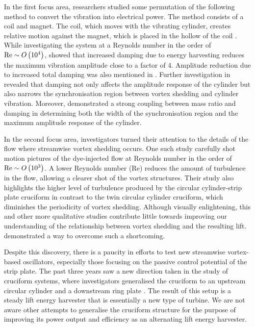 \documentclass[oneside]{utmthesis}
\begin{document}
In the first focus area, researchers studied some permutation of the following method to convert the vibration into electrical power. The method consists of a coil and magnet. The coil, which moves with the vibrating cylinder, creates relative motion against the magnet, which is placed in the hollow of the coil \citep{Koide2009}.
While investigating the system at a Reynolds number in the order of $\text{Re} \sim O \left( 10^{4} \right)$, \citet{Koide2009} showed that increased damping due to energy harvesting reduces the maximum vibration amplitude close to a factor of 4. Amplitude reduction due to increased total damping was also mentioned in \citet{Bernitsas2008a,Bernitsas2008b,Bernitsas2009}.
Further investigation in \citet{Nguyen2012} revealed that damping not only affects the amplitude response of the cylinder but also narrows the synchronisation region between vortex shedding and cylinder vibration. Moreover, \citet{Nguyen2012} demonstrated a strong coupling between mass ratio and damping in determining both the width of the synchronisation region and the maximum amplitude response of the cylinder.

In the second focus area, investigators turned their attention to the details of the flow where streamwise vortex shedding occurs. One such study carefully shot motion pictures of the dye-injected flow \citep{Koide2017} at Reynolds number in the order of $\text{Re} \sim O\left( 10^{3} \right)$. A lower Reynolds number (Re) reduces the amount of turbulence in the flow, allowing a clearer shot of the vortex structures.
Their study also highlights the higher level of turbulence produced by the circular cylinder-strip plate cruciform in contrast to the twin circular cylinder cruciform, which diminishes the periodicity of vortex shedding. Although visually enlightening, this and other more qualitative studies contribute little towards improving our understanding of the relationship between vortex shedding and the resulting lift. \citet{Deng2007} demonstrated a way to overcome such a shortcoming.

Despite this discovery, there is a paucity in efforts to test new streamwise vortex-based oscillators, especially those focusing on the passive control potential of the strip plate. The past three years saw a new direction taken in the study of cruciform systems, where investigators generalised the cruciform to an upstream circular cylinder and a downstream ring plate \citep{Hemsuwan2018a,Hemsuwan2018b,Hemsuwan2018c,Hemsuwan2018d}. The result of this setup is a steady lift energy harvester that is essentially a new type of turbine. We are not aware other attempts to generalise the cruciform structure for the purpose of improving its power output and efficiency as an alternating lift energy harvester.
\end{document}
